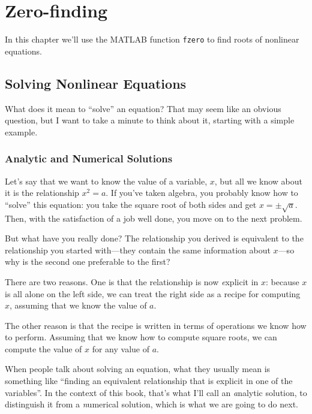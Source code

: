 \chapter{Zero-finding}
\minitoc{}
In this chapter we'll use the MATLAB function {\tt fzero} to find roots of nonlinear equations.


\section{Solving Nonlinear Equations}


What does it mean to ``solve'' an equation?  That may seem like an
obvious question, but I want to take a minute to think about it,
starting with a simple example.

\subsection{Analytic and Numerical Solutions}

Let's say that we want to know the
value of a variable, $x$, but all we know about it is the relationship
$x^2 = a$. If you've taken algebra, you probably know how to ``solve'' this
equation: you take the square root of both sides and get
$x = \pm \sqrt{a}$.  Then, with the satisfaction of a job well done,
you move on to the next problem.


But what have you really done?  The relationship you derived is
equivalent to the relationship you started with---they contain the
same information about $x$---so why is the second one preferable
to the first?

There are two reasons.  One is that the relationship is now {\emph explicit}
in $x$: because $x$ is all alone on the left side, we can treat
the right side as a recipe for computing $x$, assuming that we
know the value of $a$.


The other reason is that the recipe is written in terms of operations
we know how to perform.  Assuming that we know how to compute square
roots, we can compute the value of $x$ for any value of $a$.

When people talk about solving an equation, what they usually mean
is something like ``finding an equivalent relationship that is
explicit in one of the variables''.  In the context of this book,
that's what I'll call an {\emph analytic solution}, to distinguish
it from a {\emph numerical solution}, which is what we are going to
do next.

